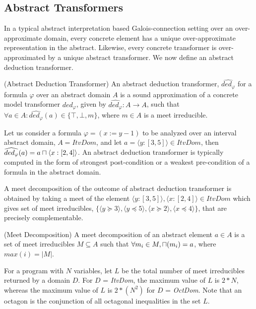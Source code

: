 \subsection{Abstract Transformers}

In a typical abstract interpretation based Galois-connection setting
over an over-approximate domain, every concrete element has a unique
over-approximate representation in the abstract.  Likewise, every
concrete transformer is over-approximated by a unique abstract
transformer.  We now define an abstract deduction transformer.

\begin{definition}{(Abstract Deduction Transformer)} An abstract deduction
transformer, $\widehat{ded_{\varphi}}$ for a formula $\varphi$ over an abstract 
domain $A$ is a sound approximation of a concrete model transformer
$ded_{\varphi}$, given by $\widehat{ded_{\varphi}} : A \rightarrow A$, such that 
$\forall a \in A: \widehat{ded_{\varphi}}(a) \in \{\top, \bot, m\}$, where 
$m \in A$ is a meet irreducible.   
\end{definition}

Let us consider a formula $\varphi = (x:=y-1)$ to be analyzed over 
an interval abstract domain, $A = ItvDom$, and let $a = \langle y:[3, 5]
\rangle \in ItvDom$, then $\widehat{ded_{\varphi}}(a) = a \sqcap \langle x:[2, 4]
\rangle$.  An abstract deduction transformer is typically computed in the form 
of strongest post-condition or a weakest pre-condition of a formula in the 
abstract domain.  

A meet decomposition of the outcome of abstract deduction transformer 
is obtained by taking a meet of the element $\langle y:[3, 5] \rangle, 
\langle x:[2, 4] \rangle \in ItvDom$ which gives set of meet irreducibles, 
$\{ \langle y \succeq 3 \rangle, \langle y \preceq 5 \rangle, 
\langle x \succeq 2 \rangle, \langle x \preceq 4 \rangle \}$, that are 
precisely complementable.

\begin{definition}{(Meet Decomposition)} A meet decomposition of an abstract
element $a \in A$ is a set of meet irreducibles $M \subseteq A$ such that 
$\forall m_i \in M, \sqcap(m_i) = a$, where $max(i) = |M|$.
\end{definition}
 
For a program with $N$ variables, let $L$ be the total number of 
meet irreducibles returned by a domain $D$.  For $D$ = {\em ItvDom}, the 
maximum value of $L$ is $2*N$, whereas the maximum value of $L$ is 
$2*(N^2)$ for $D$ = {\em OctDom}. Note that an octagon is the conjunction 
of all octagonal inequalities in the set $L$.
%


